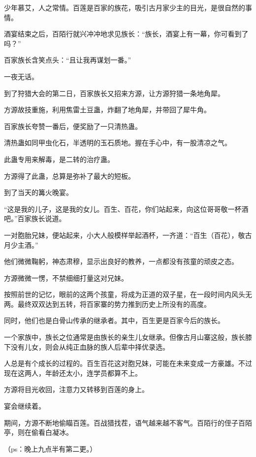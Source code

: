 \begin{this_body}
少年慕艾，人之常情。百莲是百家的族花，吸引古月家少主的目光，是很自然的事情。

酒宴结束之后，百陌行就兴冲冲地求见族长：“族长，酒宴上有一幕，你可看到了吗？”

百家族长含笑点头：“且让我再谋划一番。”

一夜无话。

到了狩猎大会的第二日，百家族长又招来方源，让方源狩猎一条地角犀。

方源故技重施，利用焦雷土豆蛊，炸翻了地角犀，并带回了犀牛角。

百家族长夸赞一番后，便奖励了一只清热蛊。

清热蛊如同甲虫化石，半透明的玉石质地。握在手心中，有一股清凉之气。

此蛊专用来解毒，是二转的治疗蛊。

方源得了此蛊，总算是弥补了最大的短板。

到了当天的篝火晚宴。

“这是我的儿子，这是我的女儿。百生、百花，你们站起来，向这位哥哥敬一杯酒吧。”百家族长说道。

一对胞胎兄妹，便站起来，小大人般模样举起酒杯，一齐道：“百生（百花），敬古月少主酒。”

他们微微鞠躬，神态肃穆，显示出良好的教养，一点都没有孩童的顽皮之态。

方源微微一愣，不禁细细打量这对兄妹。

按照前世的记忆，眼前的这两个孩童，将成为正道的双子星，在一段时间内风头无两。最终双双达到五转，将百家寨的势力推到历史上所没有的高度。

同时，他们也是白骨山传承的继承者。其中，百生更是百家今后的族长。

一个家族中，族长之位通常是由族长的亲生儿女继承。但像古月山寨这般，族长膝下没有儿女，则会从纯正血脉的族人后辈中择优录选。

人总是有个成长的过程的。百生百花这对胞兄妹，可能在未来变成一方豪雄。不过现在这两人，年龄还太小，连学员都算不上。

方源将目光收回，注意力又转移到百莲的身上。

宴会继续着。

期间，方源不断地偷瞄百莲。百战猎找茬，语气越来越不客气。百陌行的侄子百陌亭，则在偷看白凝冰。

（ps：晚上九点半有第二更。）

\end{this_body}

